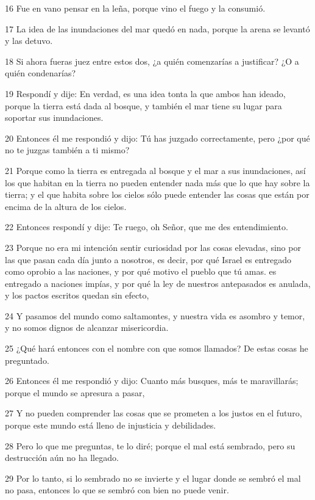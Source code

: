 \par 16 Fue en vano pensar en la leña, porque vino el fuego y la consumió.
\par 17 La idea de las inundaciones del mar quedó en nada, porque la arena se levantó y las detuvo.
\par 18 Si ahora fueras juez entre estos dos, ¿a quién comenzarías a justificar? ¿O a quién condenarías?
\par 19 Respondí y dije: En verdad, es una idea tonta la que ambos han ideado, porque la tierra está dada al bosque, y también el mar tiene su lugar para soportar sus inundaciones.
\par 20 Entonces él me respondió y dijo: Tú has juzgado correctamente, pero ¿por qué no te juzgas también a ti mismo?
\par 21 Porque como la tierra es entregada al bosque y el mar a sus inundaciones, así los que habitan en la tierra no pueden entender nada más que lo que hay sobre la tierra; y el que habita sobre los cielos sólo puede entender las cosas que están por encima de la altura de los cielos.
\par 22 Entonces respondí y dije: Te ruego, oh Señor, que me des entendimiento.
\par 23 Porque no era mi intención sentir curiosidad por las cosas elevadas, sino por las que pasan cada día junto a nosotros, es decir, por qué Israel es entregado como oprobio a las naciones, y por qué motivo el pueblo que tú amas. es entregado a naciones impías, y por qué la ley de nuestros antepasados ​​es anulada, y los pactos escritos quedan sin efecto,
\par 24 Y pasamos del mundo como saltamontes, y nuestra vida es asombro y temor, y no somos dignos de alcanzar misericordia.
\par 25 ¿Qué hará entonces con el nombre con que somos llamados? De estas cosas he preguntado.
\par 26 Entonces él me respondió y dijo: Cuanto más busques, más te maravillarás; porque el mundo se apresura a pasar,
\par 27 Y no pueden comprender las cosas que se prometen a los justos en el futuro, porque este mundo está lleno de injusticia y debilidades.
\par 28 Pero lo que me preguntas, te lo diré; porque el mal está sembrado, pero su destrucción aún no ha llegado.
\par 29 Por lo tanto, si lo sembrado no se invierte y el lugar donde se sembró el mal no pasa, entonces lo que se sembró con bien no puede venir.
